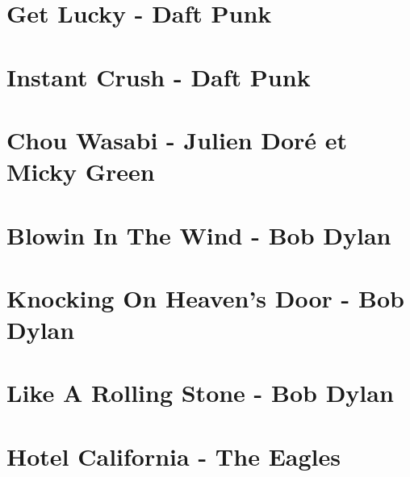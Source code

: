 \documentclass{guitartabs}
\begin{document}
\section{Get Lucky - Daft Punk}
\begin{guitar}

\end{guitar}


\section{Instant Crush - Daft Punk}
\begin{guitar}

\end{guitar}



\section{Chou Wasabi - Julien Doré et Micky Green}
\begin{guitar}

\end{guitar}


\section{Blowin In The Wind - Bob Dylan}
\begin{guitar}

\end{guitar}



\section{Knocking On Heaven's Door - Bob Dylan}
\begin{guitar}

\end{guitar}

\section*{Like A Rolling Stone - Bob Dylan}
\begin{guitar}

\end{guitar}



\section{Hotel California - The Eagles}
\begin{guitar}

\end{guitar}
\end{document}
